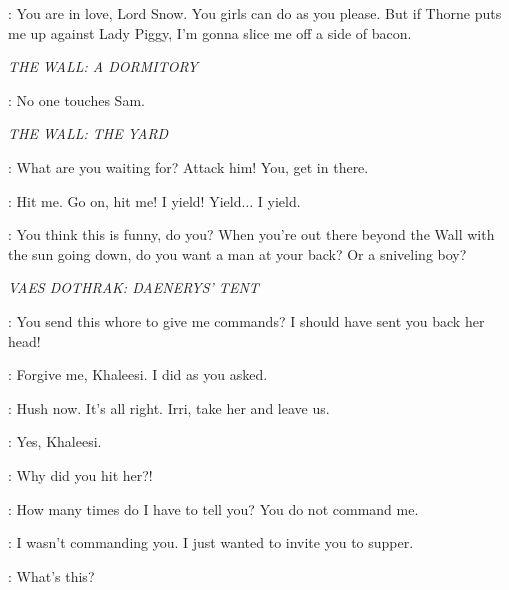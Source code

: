 \RAST: You are in love, Lord Snow. You girls can do as you please. But if Thorne puts me up against Lady Piggy, I'm gonna slice me off a side of bacon. 

\scene

\textit{THE WALL: A DORMITORY}


\JON: No one touches Sam. 

\scene

\textit{THE WALL: THE YARD}


\ALLISER: What are you waiting for?  Attack him!  You, get in there. 


\GRENN:  Hit me. Go on, hit me!   I yield! Yield$\ldots$ I yield. 

\ALLISER:  You think this is funny, do you? When you're out there beyond the Wall with the sun going down, do you want a man at your back? Or a sniveling boy? 


\scene

\textit{VAES DOTHRAK: DAENERYS' TENT}


\VISERYS: You send this whore to give me commands? I should have sent you back her head! 

\DOREAH: Forgive me, Khaleesi. I did as you asked. 

\DAENERYS: Hush now. It's all right. Irri, take her and leave us. 

\IRRI: Yes, Khaleesi. 

\DAENERYS: Why did you hit her?! 

\VISERYS: How many times do I have to tell you? You do not command me. 

\DAENERYS: I wasn't commanding you. I just wanted to invite you to supper. 

\VISERYS: What's this? 

